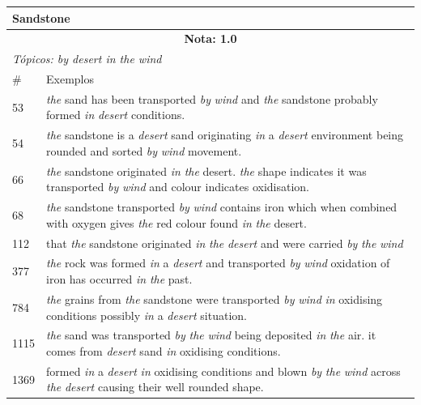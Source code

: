 \begin{table}
\footnotesize
\begin{minipage}[t]{.45\textwidth}
\begin{tabular}{ p{1.5cm} | p{5cm}}
\hline
\multicolumn{2}{l}{\textbf{Sandstone}} \\ \hline
\multicolumn{2}{c}{\textbf{Nota: 1.0}} \\ \hline 

\multicolumn{2}{l}{\textit{T{\'o}picos: by desert in the wind}} \\ \hline
 \# & Exemplos \\ \hline

53 & \textit{the} sand has been transported \textit{by} \textit{wind} and \textit{the} sandstone probably formed \textit{in} \textit{desert} conditions.\\ \hline
54 & \textit{the} sandstone is a \textit{desert} sand originating \textit{in} a \textit{desert} environment being rounded and sorted \textit{by} \textit{wind} movement.\\ \hline
66 & \textit{the} sandstone originated \textit{in} \textit{the} desert. \textit{the} shape indicates it was transported \textit{by} \textit{wind} and colour indicates oxidisation.\\ \hline
68 & \textit{the} sandstone transported \textit{by} \textit{wind} contains iron which when combined with oxygen gives \textit{the} red colour found \textit{in} \textit{the} desert.\\ \hline
112 & that \textit{the} sandstone originated \textit{in} \textit{the} \textit{desert} and were carried \textit{by} \textit{the} \textit{wind}\\ \hline
377 & \textit{the} rock was formed \textit{in} a \textit{desert} and transported \textit{by} \textit{wind} oxidation of iron has occurred \textit{in} \textit{the} past.\\ \hline
784 & \textit{the} grains from \textit{the} sandstone were transported \textit{by} \textit{wind} \textit{in} oxidising conditions possibly \textit{in} a \textit{desert} situation.\\ \hline
1115 & \textit{the} sand was transported \textit{by} \textit{the} \textit{wind} being deposited \textit{in} \textit{the} air. it comes from \textit{desert} sand \textit{in} oxidising conditions.\\ \hline
1369 & formed \textit{in} a \textit{desert} \textit{in} oxidising conditions and blown \textit{by} \textit{the} \textit{wind} across \textit{the} \textit{desert} causing their well rounded shape.\\ \hline

\end{tabular}
\end{minipage}
\end{table}
